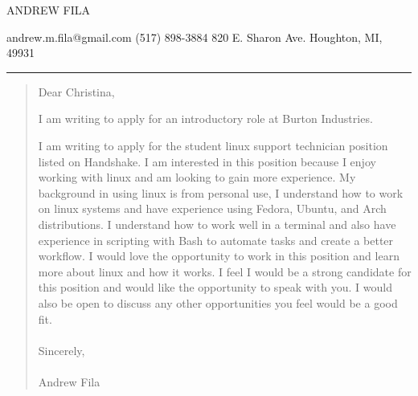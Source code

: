 \documentclass{article}
\begin{document}
\begin{center}
    \Huge ANDREW FILA
\end{center}
\faEnvelope \hspace{.05in} andrew.m.fila@gmail.com \hspace{.4in} \faPhone \hspace{.05in}(517) 898-3884\hfill \faMapMarker \hspace{.05in} 820 E. Sharon Ave. Houghton, MI, 49931
\rule{\textwidth}{.25mm}



\begin{quote}
Dear Christina,

    \hspace{2em} I am writing to apply for an introductory role at Burton Industries.


    I am writing to apply for the student linux support technician position listed on Handshake. I am interested in this position because I enjoy working with linux and am looking to gain more experience.
My background in using linux is from personal use, I understand how to work on linux systems and have experience using Fedora, Ubuntu, and Arch distributions. I understand how to work well in a terminal and also have experience in scripting with Bash to automate tasks and create a better workflow.  I would love the opportunity to work in this position and learn more about linux and how it works.
I feel I would be a strong candidate for this position and would like the opportunity to speak with you. I would also be open to discuss any other opportunities you feel would be a good fit.
\\\\
Sincerely,
\\\\
Andrew Fila

\end{quote}
\end{document}
